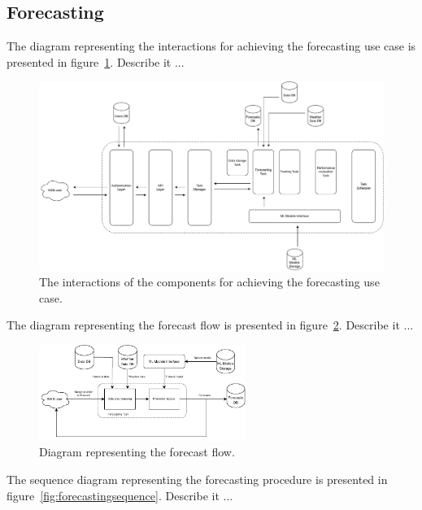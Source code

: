 \vspace{0.1 cm}
\subsection{Forecasting}
\label{sec:forecasting}
\vspace{0.1 cm}

The diagram representing the interactions for achieving the forecasting use case is presented in figure~\ref{fig:forecastinginteractions}.
Describe it ...

\begin{figure}[H]
\centering 
\includegraphics[width=1\textwidth]{images/architecture_forecasting_interactions}
\caption{The interactions of the components for achieving the forecasting use case.}
\label{fig:forecastinginteractions}
\end{figure}

The diagram representing the forecast flow is presented in figure~\ref{fig:forecastflow}.
Describe it ...

\begin{figure}[H]
\centering 
\includegraphics[width=0.6\textwidth]{images/architecture_forecast_flow}
\caption{Diagram representing the forecast flow.}
\label{fig:forecastflow}
\end{figure}

The sequence diagram representing the forecasting procedure is presented in figure~\ref{fig:forecastingsequence}.
Describe it ...


